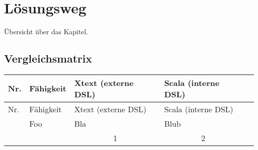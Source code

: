 \chapter{Lösungsweg}

Übersicht über das Kapitel.

\section{Vergleichsmatrix}

\begin{longtable}{|l|l|l|l|l}

  \hline
  Nr. & Fähigkeit & Xtext (externe DSL) & Scala (interne DSL) \\ \hline \hline
  \endfirsthead

  \hline
  Nr. & Fähigkeit & Xtext (externe DSL) & Scala (interne DSL) \\ \hline
  \endhead

  & Foo
  & Bla
  & Blub
  \\
  \cline{3-4}
  & & \multicolumn{1}{c|}{ 1 } & \multicolumn{1}{c|}{ 2 } \\ \hline

\end{longtable}
